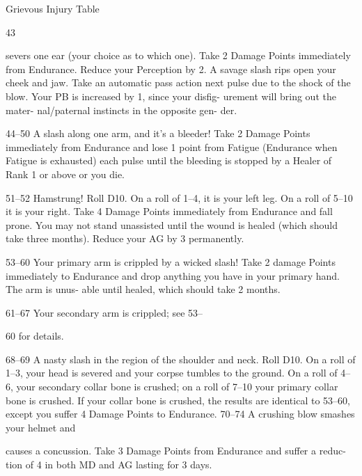 \begin{Chapter}{Grievous Injury Table}
 

43  

severs one ear (your choice as to which 
one). Take 2 Damage Points immediately 
from Endurance. Reduce your Perception 
by 2. 
A savage slash rips open your cheek and 
jaw. Take an automatic pass action next 
pulse due to the shock of the blow. Your 
PB is increased by 1, since your disfig-
urement will bring out the mater-
nal/paternal instincts in the opposite gen-
der. 

44–50   A slash along one arm, and it’s a bleeder! 
Take 2 Damage Points immediately from 
Endurance and lose 1 point from Fatigue 
(Endurance when Fatigue is exhausted) 
each pulse until the bleeding is stopped by 
a Healer of Rank 1 or above or you die. 

51–52   Hamstrung! Roll D10. On a roll of 1–4, it 
is your left leg. On a roll of 5–10 it is your 
right. Take 4 Damage Points immediately 
from Endurance and fall prone. You may 
not stand unassisted until the wound is 
healed (which should take three months). 
Reduce your AG by 3 permanently. 

53–60   Your primary arm is crippled by a wicked 
slash! Take 2 damage Points immediately 
to Endurance and drop anything you have 
in your primary hand. The arm is unus-
able until healed, which should take 2 
months. 

61–67   Your secondary arm is crippled; see 53–

60 for details. 

68–69   A nasty slash in the region of the shoulder 
and neck. Roll D10. On a roll of 1–3, your 
head is severed and your corpse tumbles 
to the ground. On a roll of 4–6, your 
secondary collar bone is crushed; on a roll 
of 7–10 your primary collar bone is 
crushed. If your collar bone is crushed, 
the results are identical to 53–60, except 
you suffer 4 Damage Points to Endurance. 
70–74   A crushing blow smashes your helmet and 

causes a concussion. Take 3 Damage 
Points from Endurance and suffer a reduc-
tion of 4 in both MD and AG lasting for 3 
days. 
\end{Chapter}
